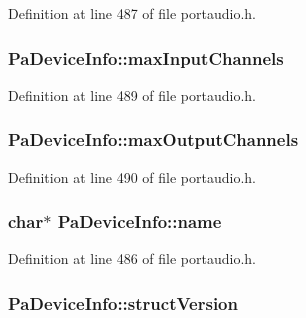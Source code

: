 Definition at line 487 of file portaudio.\+h.

\subsubsection[{\texorpdfstring{max\+Input\+Channels}{maxInputChannels}}]{ Pa\+Device\+Info\+::max\+Input\+Channels}\hypertarget{struct_pa_device_info_ad0baeeb2b6ceaf7fc9bb76109a7555e9}{}\label{struct_pa_device_info_ad0baeeb2b6ceaf7fc9bb76109a7555e9}


Definition at line 489 of file portaudio.\+h.

\subsubsection[{\texorpdfstring{max\+Output\+Channels}{maxOutputChannels}}]{ Pa\+Device\+Info\+::max\+Output\+Channels}\hypertarget{struct_pa_device_info_a48f908b21e8a11fdf0a88132b18fe7b0}{}\label{struct_pa_device_info_a48f908b21e8a11fdf0a88132b18fe7b0}


Definition at line 490 of file portaudio.\+h.

\subsubsection[{\texorpdfstring{name}{name}}]{ char$\ast$ Pa\+Device\+Info\+::name}\hypertarget{struct_pa_device_info_a1bc26d68f1d89472ae67eaa49a542aea}{}\label{struct_pa_device_info_a1bc26d68f1d89472ae67eaa49a542aea}


Definition at line 486 of file portaudio.\+h.

\subsubsection[{\texorpdfstring{struct\+Version}{structVersion}}]{ Pa\+Device\+Info\+::struct\+Version}\hypertarget{struct_pa_device_info_a2d726add4cd2af78a94c052b3a7df568}{}\label{struct_pa_device_info_a2d726add4cd2af78a94c052b3a7df568}


